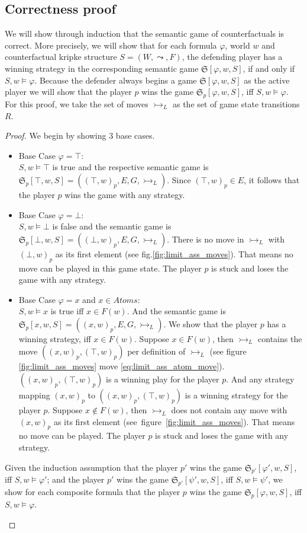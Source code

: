 \documentclass[a4paper,american]{paper}
\theoremstyle{definition}\newtheorem{definition}{Definition}
\begin{document}
\subsection{Correctness proof}
We will show through induction that the semantic game of counterfactuals is correct. More precisely, we will show that for each formula $\varphi$, world $w$ and counterfactual kripke structure $S=(W,\leadsto ,F)$, the defending player has a winning strategy in the corresponding semantic game $\mathfrak{S}[\varphi ,w,S]$, if and only if $S,w\vDash\varphi$. Because the defender always begins a game $\mathfrak{S}[\varphi ,w,S]$ as the active player we will show that the player $p$ wins the game $\mathfrak{S}_p[\varphi ,w,S]$, iff $S,w\vDash\varphi$. For this proof, we take the set of moves $\rightarrowtail_L$ as the set of game state transitions $R$.
\begin{proof}We begin by showing 3 base cases.
\begin{itemize}
\item Base Case $\varphi=\top$:\\
$S,w\vDash\top$ is true and the respective semantic game is $\mathfrak{S}_p[\top ,w,S]=((\top ,w)_p, E, G, \rightarrowtail_L)$. Since $(\top ,w)_p\in E$, it follows that the player $p$ wins the game with any strategy.
\item Base Case $\varphi=\bot$:\\
$S,w\vDash\bot$ is false and the semantic game is $\mathfrak{S}_p[\bot ,w,S]=((\bot ,w)_p, E, G, \rightarrowtail_L)$. There is no move in $\rightarrowtail_L$ with $(\bot ,w)_p$ as its first element (see fig.\ref{fig:limit_ass_moves}). That means no move can be played in this game state. The player $p$ is stuck and loses the game with any strategy.
\item Base Case $\varphi=x$ and $x\in Atoms$:\\
$S,w\vDash x$ is true iff $x\in F(w)$. And the semantic game is $\mathfrak{S}_p[x,w,S]=((x ,w)_p, E, G, \rightarrowtail_L)$. We show that the player $p$ has a winning strategy, iff $x\in F(w)$. Suppose $x\in F(w)$, then $\rightarrowtail_L$ contains the move $((x ,w)_p, (\top ,w)_p)$ per definition of $\rightarrowtail_L$ (see figure \ref{fig:limit_ass_moves} move \ref{eq:limit_ass_atom_move}). $((x ,w)_p, (\top ,w)_p)$ is a winning play for the player $p$. And any strategy mapping $(x ,w)_p$ to $((x ,w)_p, (\top ,w)_p)$ is a winning strategy for the player $p$. Suppose $x\notin F(w)$, then $\rightarrowtail_L$ does not contain any move with $(x ,w)_p$ as its first element (see~figure~\ref{fig:limit_ass_moves}). That means no move can be played. The player $p$ is stuck and loses the game with any strategy.
\end{itemize}
Given the induction assumption that the player $p'$ wins the game $\mathfrak{S}_{p'}[\varphi' ,w,S]$, iff $S,w\vDash\varphi'$; and the player $p'$ wins the game $\mathfrak{S}_{p'}[\psi' ,w,S]$, iff $S,w\vDash\psi'$, we show for each composite formula that the player $p$ wins the game $\mathfrak{S}_p[\varphi ,w,S]$, iff $S,w\vDash\varphi$.
\begin{itemize}


\end{itemize}
\end{proof}
\end{document}
